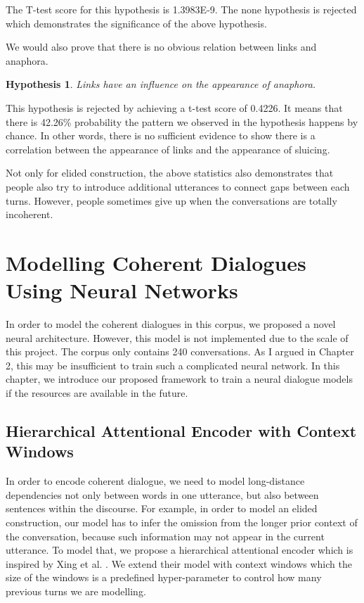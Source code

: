 \documentclass[bsc,frontabs,twoside,singlespacing,parskip,deptreport]{infthesis}     %
\newtheorem{hypo}{Hypothesis}[chapter]
\begin{document}
The T-test score for this hypothesis is 1.3983E-9. The none hypothesis is rejected which demonstrates the significance of the above hypothesis.

We would also prove that there is no obvious relation between links and anaphora.

\begin{hypo}
Links have an influence on the appearance of anaphora.
\end{hypo}

This hypothesis is rejected by achieving a t-test score of 0.4226. It means that there is 42.26\% probability the pattern we observed in the hypothesis happens by chance. In other words, there is no sufficient evidence to show there is a correlation between the appearance of links and the appearance of sluicing.

Not only for elided construction, the above statistics also demonstrates that people also try to introduce additional utterances to connect gaps between each turns. However, people sometimes give up when the conversations are totally incoherent.


\chapter{Modelling Coherent Dialogues Using Neural Networks}

In order to model the coherent dialogues in this corpus, we proposed a novel neural architecture. However, this model is not implemented due to the scale of this project. The corpus only contains 240 conversations. As I argued in Chapter 2, this may be insufficient to train such a complicated neural network. In this chapter, we introduce our proposed framework to train a neural dialogue models if the resources are available in the future.

\section{Hierarchical Attentional Encoder with Context Windows}

In order to encode coherent dialogue, we need to model long-distance dependencies not only between words in one utterance, but also between sentences within the discourse. For example, in order to model an elided construction, our model has to infer the omission from the longer prior context of the conversation, because such information may not appear in the current utterance. To model that, we propose a hierarchical attentional encoder which is inspired by Xing et al. \cite{xing2018hierarchical}. We extend their model with context windows which the size of the windows is a predefined hyper-parameter to control how many previous turns we are modelling. 
\end{document}
